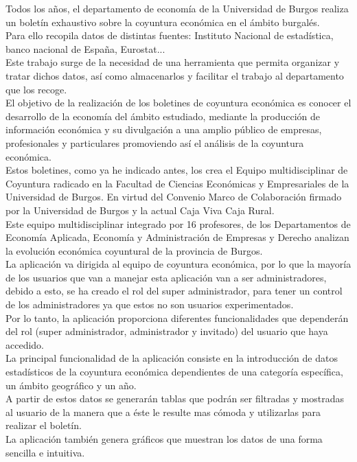 Todos los años, el departamento de economía de la Universidad de Burgos realiza un boletín exhaustivo sobre la coyuntura económica en el ámbito burgalés.\\
Para ello recopila datos de distintas fuentes: Instituto Nacional de estadística, banco nacional de España, Eurostat...\\
Este trabajo surge de la necesidad de una herramienta que permita organizar y tratar dichos datos, así como almacenarlos y facilitar el trabajo al departamento que los recoge.\\
El objetivo de la realización de los boletines de coyuntura económica es conocer el desarrollo de la economía del ámbito estudiado, mediante la producción de información económica y su divulgación a una amplio público de empresas, profesionales y particulares promoviendo así el análisis de la coyuntura económica.\\
Estos boletines, como ya he indicado antes, los crea el Equipo multidisciplinar de Coyuntura radicado en la Facultad de Ciencias Económicas y Empresariales de la Universidad de Burgos. En virtud del Convenio Marco de Colaboración firmado por la Universidad de Burgos y la actual Caja Viva Caja Rural.\\
Este equipo multidisciplinar integrado por 16 profesores, de los Departamentos de Economía Aplicada, Economía y Administración de Empresas y Derecho analizan la evolución económica coyuntural de la provincia de Burgos.\\
La aplicación va dirigida al equipo de coyuntura económica, por lo que la mayoría de los usuarios que van a manejar esta aplicación van a ser administradores, debido a esto, se ha creado el rol del super administrador, para tener un control de los administradores ya que estos no son usuarios experimentados.\\
Por lo tanto, la aplicación proporciona diferentes funcionalidades que dependerán del rol (super administrador, administrador y invitado) del usuario que haya accedido.\\
La principal funcionalidad de la aplicación consiste en la introducción de datos estadísticos de la coyuntura económica dependientes de una categoría específica, un ámbito geográfico y un
año.\\
A partir de estos datos se generarán tablas que podrán ser filtradas y mostradas al usuario de la manera que a éste le resulte mas cómoda y utilizarlas para realizar el boletín.\\
La aplicación también genera gráficos que muestran los datos de una forma sencilla e intuitiva.\\

